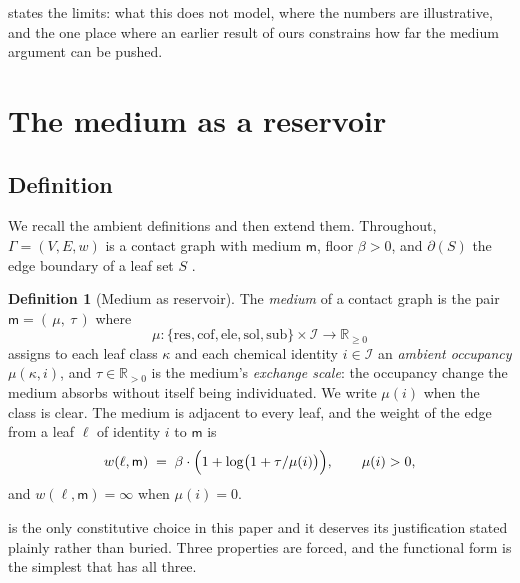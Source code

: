 \documentclass[11pt,twocolumn,a4paper]{article}
\theoremstyle{thmstyle}
\theoremstyle{definition}
\newtheorem{definition}[theorem]{Definition}
\theoremstyle{remark}
\newcommand{\R}{\mathbb{R}}
\newcommand{\flo}{\beta}
\newcommand{\cut}{\partial}
\newcommand{\med}{\mathsf{m}}
\begin{document}
 states the limits: what this does not model, where the
numbers are illustrative, and the one place where an earlier result of
ours constrains how far the medium argument can be pushed.

\section{The medium as a reservoir}
\label{sec:medium}

\subsection{Definition}

We recall the ambient definitions and then extend them. Throughout,
$\Gamma=(V,E,w)$ is a contact graph with medium $\med$, floor $\flo>0$,
and $\cut(S)$ the edge boundary of a leaf set $S$
\citep{sachikonye2026shakespeare,sachikonye2025graphs}.

\begin{definition}[Medium as reservoir]
\label{def:reservoir}
The \emph{medium} of a contact graph is the pair
$\med = (\,\mu,\ \tau\,)$ where
\[
\mu \colon \{\mathrm{res},\mathrm{cof},\mathrm{ele},\mathrm{sol},
             \mathrm{sub}\} \times \mathcal{I} \longrightarrow \R_{\ge 0}
\]
assigns to each leaf class $\kappa$ and each chemical identity
$i\in\mathcal{I}$ an \emph{ambient occupancy} $\mu(\kappa,i)$, and
$\tau\in\R_{>0}$ is the medium's \emph{exchange scale}: the occupancy
change the medium absorbs without itself being individuated. We write
$\mu(i)$ when the class is clear. The medium is adjacent to every leaf,
and the weight of the edge from a leaf $\ell$ of identity $i$ to $\med$
is
\begin{equation}
w(\ell,\med) \;=\; \flo \cdot \Bigl(1 + \log\bigl(1 + \tau/\mu(i)\bigr)\Bigr),
\qquad \mu(i) > 0,
\label{eq:medium-weight}
\end{equation}
and $w(\ell,\med) = \infty$ when $\mu(i)=0$.
\end{definition}

 is the only constitutive choice in this paper and
it deserves its justification stated plainly rather than buried. Three
properties are forced, and the functional form is the simplest that has
all three.
\end{document}
